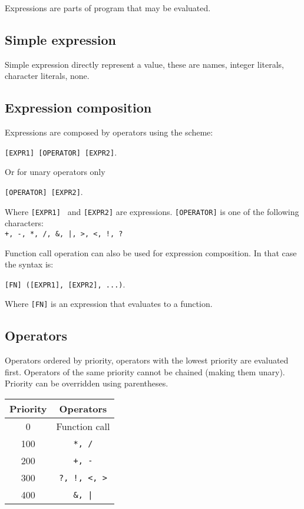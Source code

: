 \documentclass[a4paper,11pt,openany]{article}
\begin{document}
Expressions are parts of program that may be evaluated.

\subsection{Simple expression}

Simple expression directly represent a value, these are names, integer literals, character literals, none. 



\subsection{Expression composition}

Expressions are composed by operators using the scheme:

\texttt{[EXPR1] [OPERATOR] [EXPR2]}.

Or for unary operators only

\texttt{[OPERATOR] [EXPR2]}.

Where \texttt{[EXPR1] } and \texttt{[EXPR2]} are expressions. \texttt{[OPERATOR]} is one of the following characters:\\ \texttt{+, -, *, /, \&, |, >, <, !, ?}

Function call operation can also be used for expression composition. In that case the syntax is: 

\texttt{[FN] ([EXPR1], [EXPR2], ...)}.

Where \texttt{[FN]} is an expression that evaluates to a function.

\subsection{Operators}

Operators ordered by priority, operators with the lowest priority are evaluated first. Operators of the same priority cannot be chained (making them unary). Priority can be overridden using parentheses.

\begin{center}
	\begin{tabular}{cc}
		Priority & Operators \\ \hline
		0 & Function call \\ 
		100 & \texttt{*, /} \\ 
		200 & \texttt{+, -} \\ 
		300 & \texttt{?, !, <, >} \\ 
		400 & \texttt{\&, |}
	\end{tabular}
\end{center}
\end{document}
